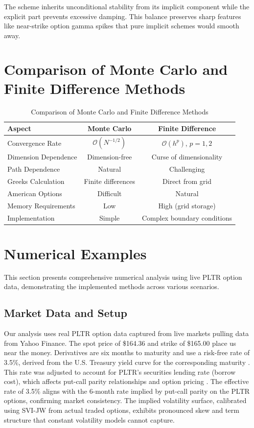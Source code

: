\documentclass[11pt,a4paper]{article}
\begin{document}
The scheme inherits unconditional stability from its implicit component while the explicit part prevents excessive damping. This balance preserves sharp features like near-strike option gamma spikes that pure implicit schemes would smooth away.

\section{Comparison of Monte Carlo and Finite Difference Methods}

\begin{table}[H]
\centering
\caption{Comparison of Monte Carlo and Finite Difference Methods}
\begin{tabular}{lcc}
\toprule
\textbf{Aspect} & \textbf{Monte Carlo} & \textbf{Finite Difference} \\
\midrule
Convergence Rate & $\mathcal{O}(N^{-1/2})$ & $\mathcal{O}(h^p)$, $p=1,2$ \\
Dimension Dependence & Dimension-free & Curse of dimensionality \\
Path Dependence & Natural & Challenging \\
Greeks Calculation & Finite differences & Direct from grid \\
American Options & Difficult & Natural \\
Memory Requirements & Low & High (grid storage) \\
Implementation & Simple & Complex boundary conditions \\
\bottomrule
\end{tabular}
\end{table}

\section{Numerical Examples}

This section presents comprehensive numerical analysis using live PLTR option data, demonstrating the implemented methods across various scenarios.

\subsection{Market Data and Setup}

Our analysis uses real PLTR option data captured from live markets pulling data from Yahoo Finance. The spot price of \$164.36 and strike of \$165.00 place us near the money. Derivatives are six months to maturity and use a risk-free rate of 3.5\%, derived from the U.S. Treasury yield curve for the corresponding maturity \cite{Treasury2025}. This rate was adjusted to account for PLTR's securities lending rate (borrow cost), which affects put-call parity relationships and option pricing \cite{Duffie2003}. The effective rate of 3.5\% aligns with the 6-month rate implied by put-call parity on the PLTR options, confirming market consistency. The implied volatility surface, calibrated using SVI-JW from actual traded options, exhibits pronounced skew and term structure that constant volatility models cannot capture.
\end{document}
